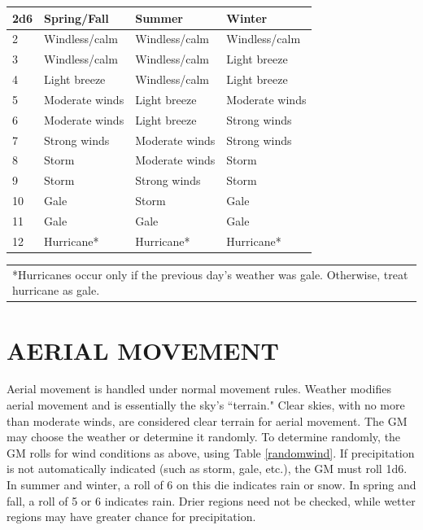 \begin{multicols}{2}
\begin{minipage}{\columnwidth}
\end{minipage}

\noindent
\begin{minipage}{\columnwidth}

\label{randomwind}
\noindent
\begin{tabular}{|p{}|p{}|p{}|p{}|}
\hline
2d6	& Spring/Fall			& Summer			& Winter \\
\hline\hline
\rowcolor[gray]{.9}2	& Windless/calm		& Windless/calm		& Windless/calm \\
3	& Windless/calm		& Windless/calm		& Light breeze \\
\rowcolor[gray]{.9}4	& Light breeze		& Windless/calm		& Light breeze \\
5	& Moderate winds	& Light breeze		& Moderate winds \\
\rowcolor[gray]{.9}6	& Moderate winds	& Light breeze		& Strong winds \\
7	& Strong winds		& Moderate winds	& Strong winds \\
\rowcolor[gray]{.9}8	& Storm				& Moderate winds	& Storm \\
9	& Storm				& Strong winds		& Storm \\
\rowcolor[gray]{.9}10	& Gale				& Storm				& Gale \\
11	& Gale				& Gale				& Gale \\
\rowcolor[gray]{.9}12	& Hurricane*		& Hurricane*		& Hurricane* \\
\hline
\end{tabular}
\noindent\begin{tabular}{p{}}
*Hurricanes occur only if the previous day's weather was gale.  Otherwise, treat hurricane as gale. \\
\end{tabular}\vspace{.5em}

\end{minipage}

\section{AERIAL MOVEMENT}

Aerial movement is handled under normal movement rules.  Weather modifies aerial movement and is essentially the sky's ``terrain."  Clear skies, with no more than moderate winds, are considered clear terrain for aerial movement.  The GM may choose the weather or determine it randomly.  To determine randomly, the GM rolls for wind conditions as above, using Table \ref{randomwind}.  If precipitation is not automatically indicated (such as storm, gale, etc.), the GM must roll 1d6.  In summer and winter, a roll of 6 on this die indicates rain or snow.  In spring and fall, a roll of 5 or 6 indicates rain.  Drier regions need not be checked, while wetter regions may have greater chance for precipitation.


\end{multicols}

